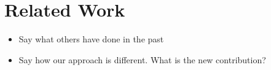 \section{Related Work}
\label{sect:related}

\begin{itemize}
  \item Say what others have done in the past
  \item Say how our approach is different. What is the new contribution?
\end{itemize}
%
\cite{DisparateImpact}
%
%
